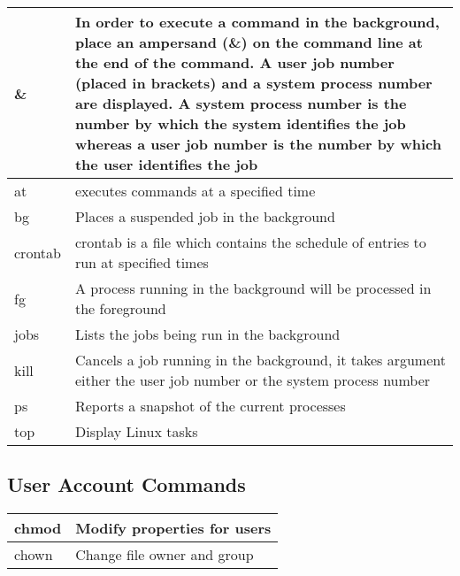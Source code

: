 \begin{tabular}{|p{}|p{}|} \hline
\&      & In order to execute a command in the background, place an ampersand (\&) on the command line at the end of the command. A user job number (placed in brackets) and a system process number are displayed. A system process number is the number by which the system identifies the job whereas a user job number is the number by which the user identifies the job \\ \hline
at      & executes commands at a specified time \\ \hline
bg      & Places a suspended job in the background \\ \hline
crontab & crontab is a file which contains the schedule of entries to run at specified times \\ \hline
fg      & A process running in the background will be processed in the foreground \\ \hline
jobs    & Lists the jobs being run in the background \\ \hline
kill    & Cancels a job running in the background, it takes argument either the user job number or the system process number \\ \hline
ps      & Reports a snapshot of the current processes \\ \hline
top     & Display Linux tasks \\ \hline
\end{tabular}


\subsection{User Account Commands}

\begin{tabular}{|p{}|p{}|} \hline
chmod    & Modify properties for users \\ \hline
chown    & Change file owner and group \\ \hline
\end{tabular}
